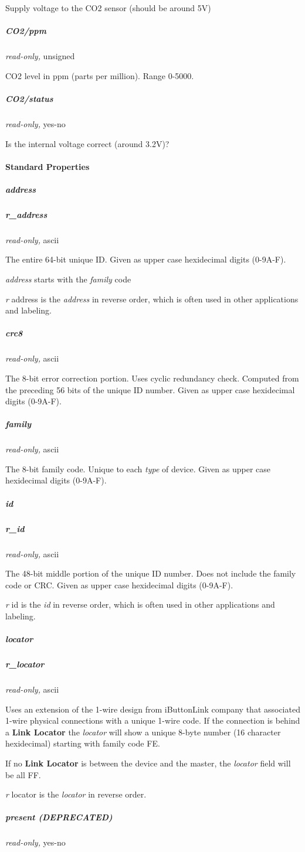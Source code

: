 Supply voltage to the CO2 sensor (should be around 5V) 
\subparagraph*{CO2/ppm}\textit{read-only,}
unsigned 

CO2 level in ppm (parts per million). Range 0-5000. 
\subparagraph*{CO2/status}\textit{read-only,} yes-no


Is the internal voltage correct (around 3.2V)? 
\paragraph*{Standard Properties}
     
    
\subparagraph*{address}
\subparagraph*{r\_address}\textit{read-only,} ascii 

The entire 64-bit unique ID. Given as upper case hexidecimal digits (0-9A-F).


\textit{address} starts with the \textit{family} code 

\textit{r} address is the \textit{address} in reverse order, which is often used in other
applications and labeling. 
\subparagraph*{crc8}\textit{read-only,} ascii 

The 8-bit error correction portion. Uses cyclic redundancy check. Computed
from the preceding 56 bits of the unique ID number. Given as upper case
hexidecimal digits (0-9A-F). 
\subparagraph*{family}\textit{read-only,} ascii 

The 8-bit family code. Unique to each \textit{type} of device. Given as upper case
hexidecimal digits (0-9A-F). 
\subparagraph*{id}
\subparagraph*{r\_id}\textit{read-only,} ascii 

The 48-bit middle portion of the unique ID number. Does not include the family
code or CRC. Given as upper case hexidecimal digits (0-9A-F). 

\textit{r} id is the \textit{id} in reverse order, which is often used in other applications
and labeling. 
\subparagraph*{locator}
\subparagraph*{r\_locator}\textit{read-only,} ascii 

Uses an extension of the 1-wire design from iButtonLink company that associated
1-wire physical connections with a unique 1-wire code. If the connection is
behind a \textbf{Link Locator} the \textit{locator} will show a unique 8-byte number (16 character
hexidecimal) starting with family code FE. 

If no \textbf{Link Locator} is between the device and the master, the \textit{locator} field
will be all FF. 

\textit{r} locator is the \textit{locator} in reverse order. 
\subparagraph*{present (DEPRECATED)}\textit{read-only,}
yes-no 

